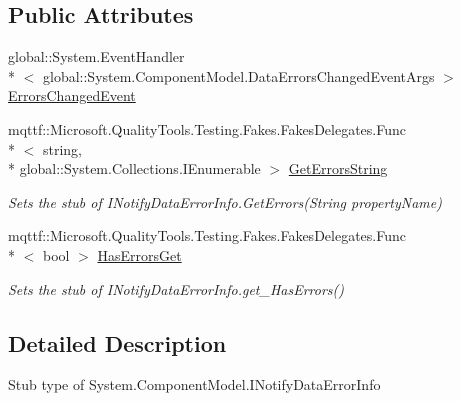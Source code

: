 \subsection*{Public Attributes}
\begin{DoxyCompactItemize}
\item 
global\-::\-System.\-Event\-Handler\\*
$<$ global\-::\-System.\-Component\-Model.\-Data\-Errors\-Changed\-Event\-Args $>$ \hyperlink{class_system_1_1_component_model_1_1_fakes_1_1_stub_i_notify_data_error_info_afe9f3bc09b5b5b2de10c499c2f620ca0}{Errors\-Changed\-Event}
\item 
mqttf\-::\-Microsoft.\-Quality\-Tools.\-Testing.\-Fakes.\-Fakes\-Delegates.\-Func\\*
$<$ string, \\*
global\-::\-System.\-Collections.\-I\-Enumerable $>$ \hyperlink{class_system_1_1_component_model_1_1_fakes_1_1_stub_i_notify_data_error_info_ad835e70cc42280723e7d65aa684b8db1}{Get\-Errors\-String}
\begin{DoxyCompactList}\small\item\em Sets the stub of I\-Notify\-Data\-Error\-Info.\-Get\-Errors(\-String property\-Name)\end{DoxyCompactList}\item 
mqttf\-::\-Microsoft.\-Quality\-Tools.\-Testing.\-Fakes.\-Fakes\-Delegates.\-Func\\*
$<$ bool $>$ \hyperlink{class_system_1_1_component_model_1_1_fakes_1_1_stub_i_notify_data_error_info_acc1b90d132ee1fcf1742e58f46d3bacb}{Has\-Errors\-Get}
\begin{DoxyCompactList}\small\item\em Sets the stub of I\-Notify\-Data\-Error\-Info.\-get\-\_\-\-Has\-Errors()\end{DoxyCompactList}\end{DoxyCompactItemize}


\subsection{Detailed Description}
Stub type of System.\-Component\-Model.\-I\-Notify\-Data\-Error\-Info




